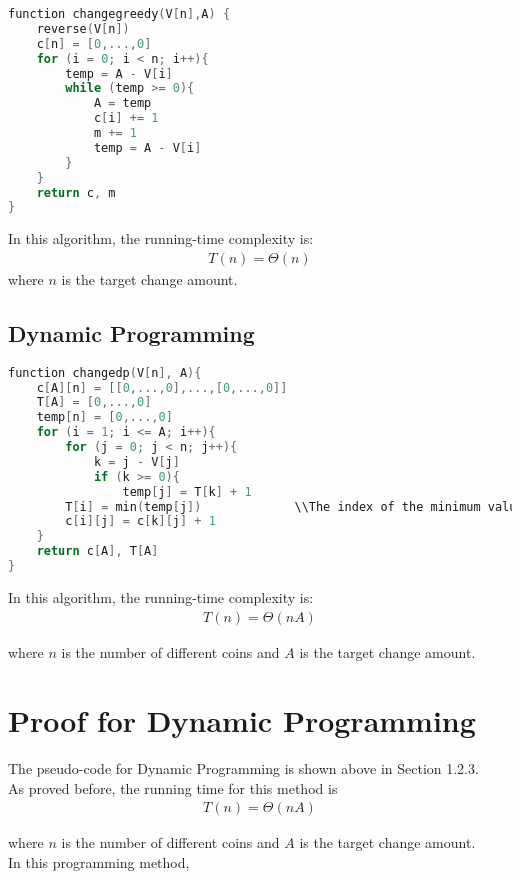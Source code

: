 \documentclass[11pt]{scrreprt}
\begin{document}
\begin{lstlisting}[language=c]
function changegreedy(V[n],A) {
	reverse(V[n])
	c[n] = [0,...,0]
	for (i = 0; i < n; i++){
		temp = A - V[i]
		while (temp >= 0){
		    A = temp
		    c[i] += 1
		    m += 1
		    temp = A - V[i]
		}
	}
	return c, m
}
\end{lstlisting}

In this algorithm, the running-time complexity is:
\begin{eqnarray*}
T(n) = \Theta(n)
\end{eqnarray*}
 where $n$ is the target change amount.
\subsection{Dynamic Programming}

\begin{lstlisting}[language=c]
function changedp(V[n], A){
	c[A][n] = [[0,...,0],...,[0,...,0]]
	T[A] = [0,...,0]
	temp[n] = [0,...,0]
	for (i = 1; i <= A; i++){
		for (j = 0; j < n; j++){
			k = j - V[j]
			if (k >= 0){
				temp[j] = T[k] + 1
		T[i] = min(temp[j])				\\The index of the minimum value of array temp is j.
		c[i][j] = c[k][j] + 1
	}
	return c[A], T[A]
}
\end{lstlisting}

In this algorithm, the running-time complexity is:
\begin{eqnarray*}
T(n) = \Theta(nA)
\end{eqnarray*}

where $n$ is the number of different coins and $A$ is the target change amount.


\section{Proof for Dynamic Programming}


The pseudo-code for Dynamic Programming is shown above in Section 1.2.3.\\

As proved before, the running time for this method is
\begin{eqnarray*}
T(n)  =  \Theta(nA)
\end{eqnarray*}

where $n$ is the number of different coins and $A$ is the target change amount.\\

In this programming method,\\
\end{document}
